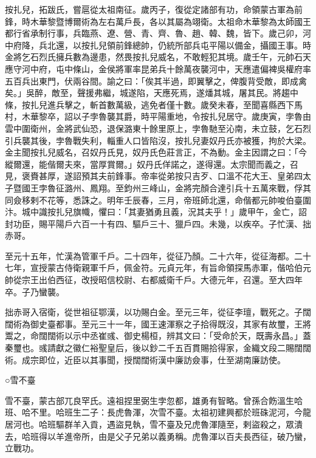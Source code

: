 \begin{pinyinscope}
 按扎兒，拓跋氏，嘗扈從太祖南征。歲丙子，復從定諸部有功，命領蒙古軍為前鋒，時木華黎暨博爾術為左右萬戶長，各以其屬為翊衛。太祖命木華黎為太師國王都行省承制行事，兵臨燕、遼、營、青、齊、魯、趙、韓、魏，皆下。歲己卯，河中府降，兵北還，以按扎兒領前鋒總帥，仍統所部兵屯平陽以備金，攝國王事。時金將乞石烈氏擁兵數為邊患，然畏按扎兒威名，不敢輕犯其境。歲壬午，元帥石天應守河中府，屯中條山，金侯將軍率昆弟兵十餘萬夜襲河中，天應遣偏裨吳權府率五百兵出東門，伏兩谷間。諭之曰：「俟其半過，即翼擊之，俾腹背受敵，即成禽矣。」吳醉，敵至，聲援弗繼，城遂陷，天應死焉，遂燔其城，屠其民。將趨中條，按扎兒進兵擊之，斬首數萬級，逃免者僅十數。歲癸未春，至聞喜縣西下馬村，木華黎卒，詔以子孛魯襲其爵，時平陽重地，令按扎兒居守。歲庚寅，孛魯由雲中圍衛州，金將武仙恐，退保潞東十餘里原上，孛魯馳至沁南，未立鼓，乞石烈引兵襲其後，孛魯戰失利，輜重人口皆陷沒，按扎兒妻奴丹氏亦被獲，拘於大梁。金主聞按扎兒威名，召奴丹氏見，奴丹氏色莊言正，不為動。金主因謂之曰：「今縱爾還，能偕爾夫來，當厚賞爾。」奴丹氏佯諾之，遂得還。太宗聞而義之，召見，褒賚甚厚，遂詔預其夫前鋒事。帝率從弟按只吉歹、口溫不花大王、皇弟四太子暨國王孛魯征潞州、鳳翔。至鈞州三峰山，金將完顏合達引兵十五萬來戰，俘其同僉移剌不花等，悉誅之。明年壬辰春，三月，帝班師北還，命偕都元帥唆伯臺圍汴。城中識按扎兒旗幟，懼曰：「其妻猶勇且義，況其夫乎！」歲甲午，金亡，詔封功臣，賜平陽戶六百一十有四、驅戶三十、獵戶四。未幾，以疾卒。子忙漢、拙赤哥。



 至元十五年，忙漢為管軍千戶。二十四年，從征乃顏。二十六年，從征海都。二十七年，宣授蒙古侍衛親軍千戶，佩金符。元貞元年，有旨命領探馬赤軍，偕哈伯元帥從宗王出伯西征，改授昭信校尉、右都威衛千戶。大德元年，召還。至大四年卒。子乃蠻襲。



 拙赤哥入宿衛，從世祖征鄂漢，以功賜白金。至元三年，從征李璮，戰死之。子闊闊術為御史臺都事。至元三十一年，國王速渾察之子拾得既沒，其家有故璽，王將鬻之，命闊闊術以示中丞崔彧、御史楊桓，辨其文曰：「受命於天，既壽永昌。」蓋秦璽也。彧請獻之徽仁裕聖皇后，後以鈔二千五百貫賜拾得家，金織文段二賜闊闊術。成宗即位，近臣以其事聞，授闊闊術漢中廉訪僉事，仕至湖南廉訪使。



 ○雪不臺



 雪不臺，蒙古部兀良罕氏。遠祖捏里弼生孛忽都，雄勇有智略。曾孫合飭溫生哈班、哈不里。哈班生二子：長虎魯渾，次雪不臺。太祖初建興都於班硃泥河，今龍居河也。哈班驅群羊入貢，遇盜見執，雪不臺及兄虎魯渾隨至，剌盜殺之，眾潰去，哈班得以羊進帝所，由是父子兄弟以義勇稱。虎魯渾以百夫長西征，破乃蠻，立戰功。




\end{pinyinscope}
